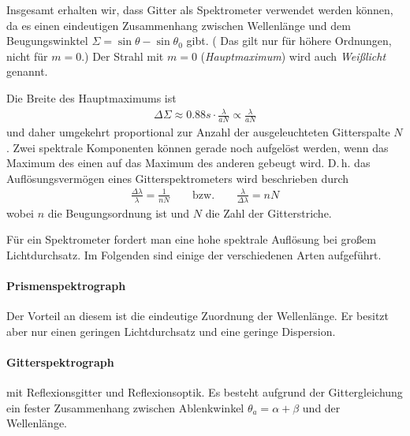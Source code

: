 \begin{enumerate}[a)]
  Insgesamt erhalten wir, dass Gitter als Spektrometer verwendet werden
  können, da es einen eindeutigen Zusammenhang zwischen Wellenlänge und
  dem Beugungswinktel $\Sigma = \sin\theta-\sin\theta_0$ gibt.
  ( Das gilt nur für höhere Ordnungen, nicht für $m=0$.)
  Der Strahl mit $m=0$ (\emph{Hauptmaximum}) wird
  auch \emph{Weißlicht} genannt.

  Die Breite des Hauptmaximums ist
  \begin{gather*}
    \Delta\Sigma 
    \approx \num{0,88}s\cdot \frac{\lambda}{aN} 
    \propto \frac{\lambda}{aN} 
  \end{gather*}
  und daher umgekehrt proportional zur Anzahl der ausgeleuchteten
  Gitterspalte $N$.
  Zwei spektrale Komponenten können gerade noch aufgelöst werden, wenn
  das Maximum des einen auf das Maximum des anderen gebeugt wird.
  D.\,h. das Auflösungsvermögen eines Gitterspektrometers wird
  beschrieben durch
  \begin{gather*}
    \frac{\Delta\lambda}{\lambda} = \frac{1}{nN}
    \qquad\text{bzw.}\qquad
    \frac{\lambda}{\Delta\lambda} = nN
  \end{gather*}
  wobei $n$ die Beugungsordnung ist 
  und $N$ die Zahl der Gitterstriche.

\end{enumerate}


Für ein Spektrometer fordert man eine hohe spektrale Auflösung bei
großem Lichtdurchsatz.
Im Folgenden sind einige der verschiedenen Arten aufgeführt.

\paragraph{Prismenspektrograph}
Der Vorteil an diesem ist die eindeutige Zuordnung der Wellenlänge. 
Er besitzt aber nur einen geringen Lichtdurchsatz und eine geringe
Dispersion.

\paragraph{Gitterspektrograph}
mit Reflexionsgitter und Reflexionsoptik. 
Es besteht aufgrund der Gittergleichung ein fester Zusammenhang
zwischen Ablenkwinkel $\theta_a=\alpha+\beta$ und der Wellenlänge.

